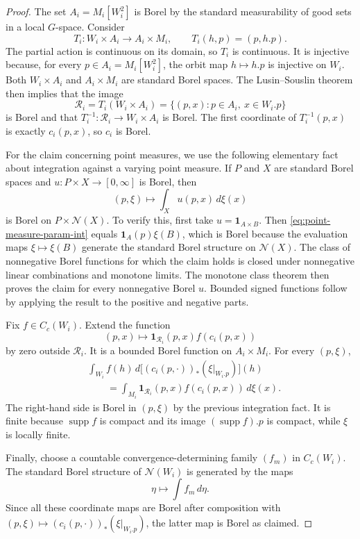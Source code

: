 \documentclass[12pt]{amsart}
\theoremstyle{definition}
\newcommand{\cN}{\mathcal N}
\newcommand{\1}{\mathbf 1}
\begin{document}
\begin{proof}
The set $A_i=M_i[W_i^2]$ is Borel by the standard measurability of good sets in a local $G$-space. Consider
\[
 T_i:W_i\times A_i\longrightarrow A_i\times M_i,
 \qquad T_i(h,p)=(p,h.p).
\]
The partial action is continuous on its domain, so $T_i$ is continuous. It is injective because, for every $p\in A_i=M_i[W_i^2]$, the orbit map $h\mapsto h.p$ is injective on $W_i$. Both $W_i\times A_i$ and $A_i\times M_i$ are standard Borel spaces. The Lusin--Souslin theorem then implies that the image
\[
 \mathscr R_i=T_i(W_i\times A_i)
 =\{(p,x):p\in A_i,\ x\in W_i.p\}
\]
is Borel and that $T_i^{-1}:\mathscr R_i\to W_i\times A_i$ is Borel. The first coordinate of $T_i^{-1}(p,x)$ is exactly $c_i(p,x)$, so $c_i$ is Borel.

For the claim concerning point measures, we use the following elementary fact about integration against a varying point measure. If $P$ and $X$ are standard Borel spaces and $u:P\times X\to[0,\infty]$ is Borel, then
\begin{equation}\label{eq:point-measure-param-int}
 (p,\xi)\longmapsto\int_Xu(p,x)\,d\xi(x)
\end{equation}
is Borel on $P\times\cN(X)$. To verify this, first take $u=\1_{A\times B}$. Then \eqref{eq:point-measure-param-int} equals $\1_A(p)\xi(B)$, which is Borel because the evaluation maps $\xi\mapsto\xi(B)$ generate the standard Borel structure on $\cN(X)$. The class of nonnegative Borel functions for which the claim holds is closed under nonnegative linear combinations and monotone limits. The monotone class theorem then proves the claim for every nonnegative Borel $u$. Bounded signed functions follow by applying the result to the positive and negative parts.

Fix $f\in C_c(W_i)$. Extend the function
\[
 (p,x)\longmapsto \1_{\mathscr R_i}(p,x)f(c_i(p,x))
\]
by zero outside $\mathscr R_i$. It is a bounded Borel function on $A_i\times M_i$. For every $(p,\xi)$,
\begin{align*}
 &\int_{W_i}f(h)\,d\bigl[(c_i(p,\cdot))_*(\xi|_{W_i.p})\bigr](h)\\
 &\qquad=\int_{M_i}\1_{\mathscr R_i}(p,x)f(c_i(p,x))\,d\xi(x).
\end{align*}
The right-hand side is Borel in $(p,\xi)$ by the previous integration fact. It is finite because $\operatorname{supp}f$ is compact and its image $(\operatorname{supp}f).p$ is compact, while $\xi$ is locally finite.

Finally, choose a countable convergence-determining family $(f_m)$ in $C_c(W_i)$. The standard Borel structure of $\cN(W_i)$ is generated by the maps
\[
 \eta\longmapsto\int f_m\,d\eta.
\]
Since all these coordinate maps are Borel after composition with
$(p,\xi)\mapsto(c_i(p,\cdot))_*(\xi|_{W_i.p})$, the latter map is Borel as claimed.
\end{proof}
\end{document}
